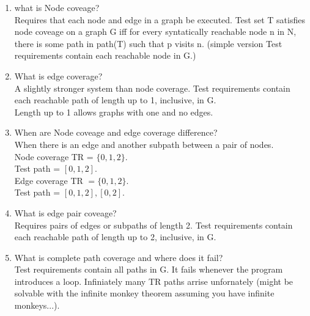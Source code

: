 \documentclass[10pt]{article}
\begin{document}
\begin{enumerate}
    \item what is Node coveage?\\
          Requires that each node and edge in a graph be executed.
          Test set T satisfies node coveage on a graph G iff for every syntatically reachable node n in N, there is some path in path(T) such that p visits n.
          (simple version Test requirements contain each reachable node in G.)\\

    \item What is edge coverage?\\
          A slightly stronger system than node coverage. Test requirements contain each reachable path of length up to 1, inclusive, in G.\\
          Length up to 1 allows graphs with one and no edges.\\

    \item When are Node coveage and edge coverage difference?\\
          When there is an edge and another subpath between a pair of nodes.\\
          Node coverage TR = $\{0 ,1 ,2\}$.\\
          Test path = $[0 , 1, 2]$.\\
          Edge coverage TR $= \{0, 1, 2\}$.\\
          Test path = $[0, 1, 2], [0, 2]$.\\

    \item What is edge pair coveage?\\
          Requires pairs of edges or subpaths of length 2. Test requirements contain each reachable path of length up to 2, inclusive, in G.\\

    \item What is complete path coverage and where does it fail?\\
          Test requirements contain all paths in G. It fails whenever the program introduces a loop. Infiniately many TR paths arrise unfornately (might be solvable with the infinite monkey theorem assuming you have infinite monkeys...).\\


\end{enumerate}
\end{document}
